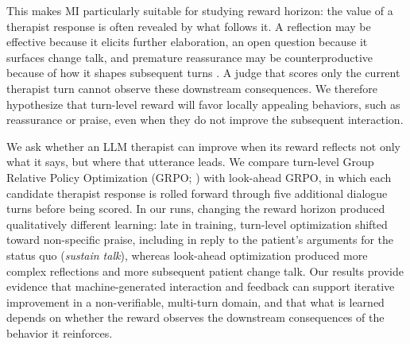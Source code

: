 This makes MI particularly suitable for studying reward horizon: the value of a therapist response is often revealed by what follows it. A reflection may be effective because it elicits further elaboration, an open question because it surfaces change talk, and premature reassurance may be counterproductive because of how it shapes subsequent turns \citep{miller2013mi}. A judge that scores only the current therapist turn cannot observe these downstream consequences. We therefore hypothesize that turn-level reward will favor locally appealing behaviors, such as reassurance or praise, even when they do not improve the subsequent interaction.

We ask whether an LLM therapist can improve when its reward reflects not only what it says, but where that utterance leads. We compare turn-level Group Relative Policy Optimization (GRPO; \citealp{shao2024deepseekmath}) with look-ahead GRPO, in which each candidate therapist response is rolled forward through five additional dialogue turns before being scored. In our runs, changing the reward horizon produced qualitatively different learning: late in training, turn-level optimization shifted toward non-specific praise, including in reply to the patient's arguments for the status quo (\emph{sustain talk}), whereas look-ahead optimization produced more complex reflections and more subsequent patient change talk. %
Our results provide evidence that machine-generated interaction and feedback can support iterative improvement in a non-verifiable, multi-turn domain, and that what is learned depends on whether the reward observes the downstream consequences of the behavior it reinforces.

